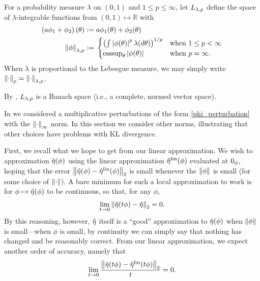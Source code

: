 

\begin{defn}
%
For a probability measure $\lambda$ on $(0,1)$ and $1 \le p \le \infty$, let
${L_{\lambda,p}}$ define the space of $\lambda$-integrable functions from
$(0,1)\mapsto\mathbb{R}$ with
%
\begin{align*}
%
\left(a \phi_1 + \phi_2 \right)(\theta) :={}&
    a \phi_1(\theta) + \phi_2(\theta) \\
\norm{\phi}_{\lambda,p} :={}&
\begin{cases}
    \left(\int \abs{\phi(\theta)}^p \lambda(d\theta)\right)^{1/p}
    & \textrm{when }1\le p < \infty\\
    \esssup_{\theta} \abs{\phi(\theta)}
    & \textrm{when }p = \infty.
\end{cases}
%
\end{align*}
%
When $\lambda$ is proportional to the  Lebesgue measure, we may simply write
$\left\Vert\cdot\right\Vert_{p} = \left\Vert\cdot\right\Vert_{\lambda,p}$.
%
\end{defn}


By \citep[Theorem 5.2.1]{dudley:2018:real}, ${L_{\lambda,p}}$ is a Banach
space (i.e., a complete, normed vector space).




In  we considered a multiplicative perturbations
of the form \eqref{phi_perturbation} with the $\left\Vert\cdot\right\Vert_{\infty}$ norm.  In
this section we consider other norms, illustrating that other choices
have problems with KL divergence.

First, we recall what we hope to get from our linear approximation.  We wish to
approximation $\hat\eta(\phi)$ using the linear approximation $\hat\eta^{\mathrm{lin}}(\phi)$
evaluated at $0_\phi$, hoping that the error $\left\Vert\hat\eta(\phi) -
\hat\eta^{\mathrm{lin}}(\phi)\right\Vert_2$ is small whenever the $\left\Vert\phi\right\Vert$ is small (for some choice
of $\left\Vert\cdot\right\Vert$).  A bare minimum for such a local approximation to work is
for $\phi \mapsto \hat\eta(\phi)$ to be continuous, so that, for any
$\phi$,
%
\begin{align*}
%
\lim_{t \rightarrow 0} \norm{\etaopt(t \phi) - \etaopt}_2 = 0.
%
\end{align*}
%
By this reasoning, however, $\hat\eta$ itself is a ``good'' approximation to
$\hat\eta(\phi)$ when $\left\Vert\phi\right\Vert$ is small---when $\phi$ is small, by
continuity we can simply say that nothing has changed and be reasonably correct.
From our linear approximation, we expect another order of accuracy, namely that
%
\begin{align*}
%
\lim_{t \rightarrow 0} \frac{\norm{\etaopt(t \phi) - \etalin(t\phi)}_2}{t} = 0.
%
\end{align*}

